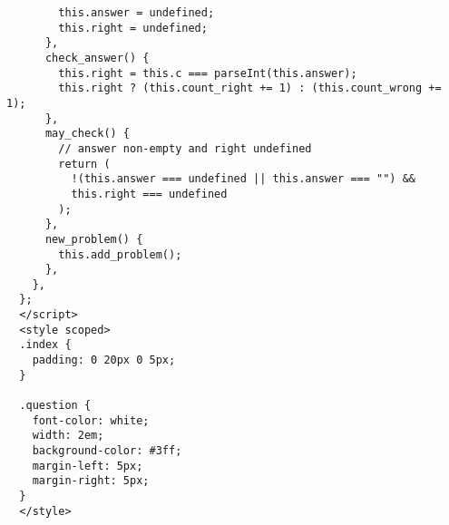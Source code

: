 \begin{lstlisting}
        this.answer = undefined;
        this.right = undefined;
      },
      check_answer() {
        this.right = this.c === parseInt(this.answer);
        this.right ? (this.count_right += 1) : (this.count_wrong += 1);
      },
      may_check() {
        // answer non-empty and right undefined
        return (
          !(this.answer === undefined || this.answer === "") &&
          this.right === undefined
        );
      },
      new_problem() {
        this.add_problem();
      },
    },
  };
  </script>
  <style scoped>
  .index {
    padding: 0 20px 0 5px;
  }
  
  .question {
    font-color: white;
    width: 2em;
    background-color: #3ff;
    margin-left: 5px;
    margin-right: 5px;
  }
  </style>  
\end{lstlisting}
\label{appendix:math_kids_basic_source_code}
